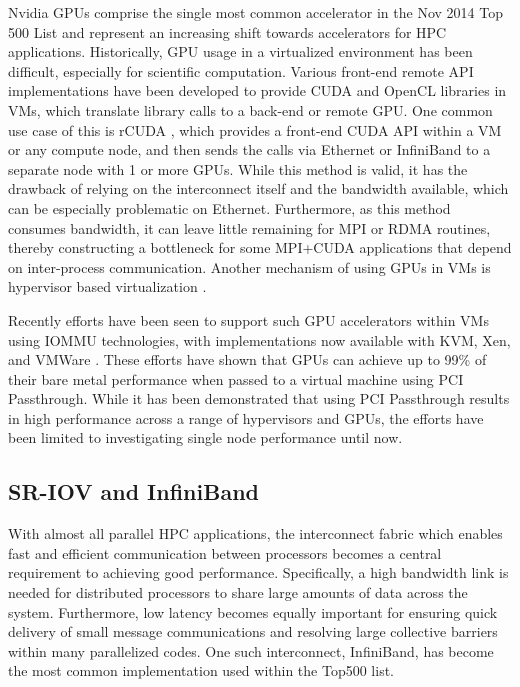 \documentclass[10pt]{sigplanconf}
\begin{document}
Nvidia GPUs comprise the single most common accelerator in the Nov 2014 Top 500 List \cite{www-top500} and represent an increasing shift towards accelerators for HPC applications. Historically, GPU usage in a virtualized environment has been difficult, especially for scientific computation. Various front-end remote API implementations have been developed to provide CUDA and OpenCL libraries in VMs, which translate library calls to a back-end or remote GPU. One common use case of this is rCUDA \cite{duato2011enabling}, which provides a front-end CUDA API within a VM or any compute node, and then sends the calls via Ethernet or InfiniBand to a separate node with 1 or more GPUs. While this method is valid, it has the drawback of relying on the interconnect itself and the bandwidth available, which can be especially problematic on Ethernet. Furthermore, as this method consumes bandwidth, it can leave little remaining for MPI or RDMA routines, thereby constructing a bottleneck for some MPI+CUDA applications that depend on inter-process communication.  Another mechanism of using GPUs in VMs is hypervisor based virtualization \cite{suzuki2014gpuvm}.

Recently efforts have been seen to support such GPU accelerators within VMs using IOMMU technologies, with implementations now available with KVM, Xen, and VMWare \cite{Walters2014cloud, Younge2014hpgc, tian2014full, Vu2014}.  These efforts have shown that GPUs can achieve up to 99\% of their bare metal performance when passed to a virtual machine using PCI Passthrough.  %
While it has been demonstrated that using PCI Passthrough results in high performance across a range of hypervisors and GPUs, the efforts have been limited to investigating single node performance until now. 

\subsection{SR-IOV and InfiniBand}

With almost all parallel HPC applications, the interconnect fabric which enables fast and efficient communication between processors becomes a central requirement to achieving good performance. Specifically, a high bandwidth link is needed for distributed processors to share large amounts of data across the system. Furthermore, low latency becomes equally important for ensuring quick delivery of small message communications and resolving large collective barriers within many parallelized codes. One such interconnect, InfiniBand, has become the most common implementation used within the Top500 list. %
\end{document}
